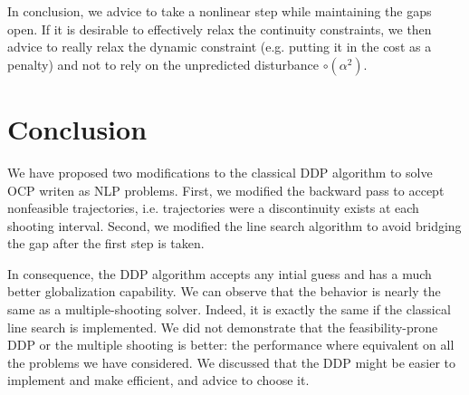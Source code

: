 \documentclass[10pt,a4paper]{article}
\begin{document}
In conclusion, we advice to take a nonlinear step while maintaining the gaps open.
If it is desirable to effectively relax the continuity constraints, we then advice to really relax the dynamic constraint (e.g. putting it in the cost as a penalty) and not to rely on the unpredicted disturbance $\circ(\alpha^2)$.

\section{Conclusion}

We have proposed two modifications to the classical DDP algorithm to solve OCP writen as NLP problems.
First, we modified the backward pass to accept nonfeasible trajectories, i.e. trajectories were a discontinuity exists at each shooting interval.
Second, we modified the line search algorithm to avoid bridging the gap after the first step is taken.

In consequence, the DDP algorithm accepts any intial guess and has a much better globalization capability.
We can observe that the behavior is nearly the same as a multiple-shooting solver.
Indeed, it is exactly the same if the classical line search is implemented.
We did not demonstrate that the feasibility-prone DDP or the multiple shooting is better: the performance where equivalent on all the problems we have considered.
We discussed that the DDP might be easier to implement and make efficient, and advice to choose it.
\end{document}
